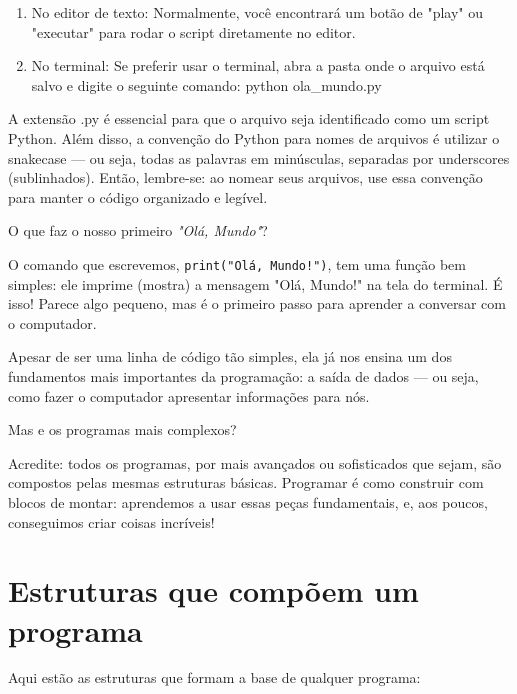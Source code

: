 \documentclass[12pt]{book}
\begin{document}
	\begin{enumerate}
		\item No editor de texto: Normalmente, você encontrará um botão de "play" ou "executar" para rodar o script diretamente no editor.
		
		\item No terminal: Se preferir usar o terminal, abra a pasta onde o arquivo está salvo e digite o seguinte comando: python ola\_mundo.py	
	\end{enumerate}
	
	\begin{tcolorbox}[colback=gray!10, colframe=black, title={\large\bfseries Importante}]
	A extensão .py é essencial para que o arquivo seja identificado como um script Python. \newline Além disso, a convenção do Python para nomes de arquivos é utilizar o snakecase --- ou seja, todas as palavras em minúsculas, separadas por underscores (sublinhados). \newline
	Então, lembre-se: ao nomear seus arquivos, use essa convenção para manter o código organizado e legível.
	\end{tcolorbox}
	
	O que faz o nosso primeiro \textit{"Olá, Mundo"}?
	
	O comando que escrevemos, \texttt{print("Olá, Mundo!")}, tem uma função bem simples: ele imprime (mostra) a mensagem "Olá, Mundo!" na tela do terminal. É isso! Parece algo pequeno, mas é o primeiro passo para aprender a conversar com o computador.
	
	Apesar de ser uma linha de código tão simples, ela já nos ensina um dos fundamentos mais importantes da programação: a saída de dados — ou seja, como fazer o computador apresentar informações para nós.
	
	Mas e os programas mais complexos?
	
	Acredite: todos os programas, por mais avançados ou sofisticados que sejam, são compostos pelas mesmas estruturas básicas. Programar é como construir com blocos de montar: aprendemos a usar essas peças fundamentais, e, aos poucos, conseguimos criar coisas incríveis!
	
	\section{Estruturas que compõem um programa}
	
	Aqui estão as estruturas que formam a base de qualquer programa:
	
\end{document}
